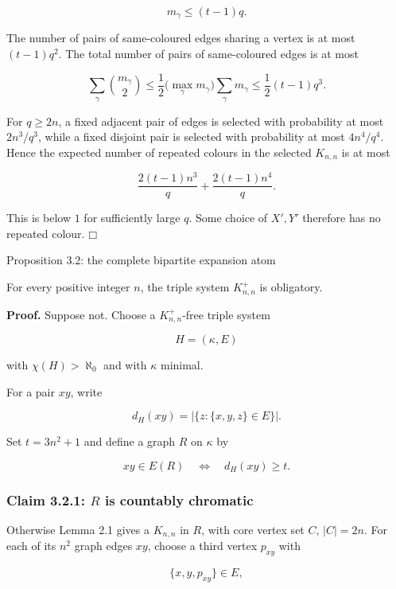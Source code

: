 \documentclass[11pt]{article}
\providecommand{\square}{\mdlgwhtsquare}
\begin{document}
\[
m_\gamma\le(t-1)q.
\]

The number of pairs of same-coloured edges sharing a vertex is at most \((t-1)q^2\). The total number of pairs of same-coloured edges is at most

\[
\sum_\gamma\binom{m_\gamma}{2}
\le \frac12\bigl(\max_\gamma m_\gamma\bigr)\sum_\gamma m_\gamma
\le \frac12(t-1)q^3.
\]

For \(q\ge2n\), a fixed adjacent pair of edges is selected with probability at most \(2n^3/q^3\), while a fixed disjoint pair is selected with probability at most \(4n^4/q^4\). Hence the expected number of repeated colours in the selected \(K_{n,n}\) is at most

\[
\frac{2(t-1)n^3}{q}+\frac{2(t-1)n^4}{q}.
\]

This is below \(1\) for sufficiently large \(q\). Some choice of \(X',Y'\) therefore has no repeated colour. \(\square\)

\label{proposition-3.2-the-complete-bipartite-expansion-atom}
\begin{propositionbox}{Proposition 3.2: the complete bipartite expansion atom}

For every positive integer \(n\), the triple system \(K_{n,n}^{+}\) is obligatory.

\end{propositionbox}
\textbf{Proof.} Suppose not. Choose a \(K_{n,n}^{+}\)-free triple system

\[
H=(\kappa,E)
\]

with \(\chi(H)>\aleph_0\) and with \(\kappa\) minimal.

For a pair \(xy\), write

\[
d_H(xy)=|\{z:\{x,y,z\}\in E\}|.
\]

Set \(t=3n^2+1\) and define a graph \(R\) on \(\kappa\) by

\[
xy\in E(R)\quad\Longleftrightarrow\quad d_H(xy)\ge t.
\]

\subsubsection{\texorpdfstring{Claim 3.2.1: \(R\) is countably chromatic}{Claim 3.2.1: R is countably chromatic}}\label{claim-3.2.1-r-is-countably-chromatic}

Otherwise Lemma 2.1 gives a \(K_{n,n}\) in \(R\), with core vertex set \(C\), \(|C|=2n\). For each of its \(n^2\) graph edges \(xy\), choose a third vertex \(p_{xy}\) with

\[
\{x,y,p_{xy}\}\in E,
\]
\end{document}
